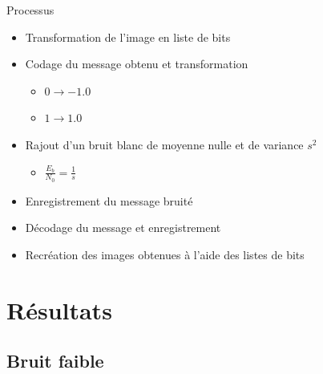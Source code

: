 \documentclass[11pt]{beamer}
\begin{document}
\begin{frame}{Processus}
	\begin{itemize}
		\item Transformation de l'image en liste de bits
		\item Codage du message obtenu et transformation
		\begin{itemize}
			\item[] $0 \to -1.0$
			\item[] $1 \to 1.0$ 
		\end{itemize}
		\item Rajout d'un bruit blanc de moyenne nulle et de variance $s^2$
		\begin{itemize}
			\item[] $\frac{E_b}{N_0} = \frac{1}{s}$
		\end{itemize}
		\item Enregistrement du message bruit\'e
		\item D\'ecodage du message et enregistrement
		\item Recr\'eation des images obtenues \`a l'aide des listes de bits
	\end{itemize}
\end{frame}


\section{R\'esultats}
\subsection{Bruit faible}
\end{document}
